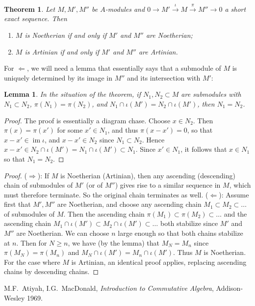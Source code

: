 \documentclass[12pt]{article}
\newtheorem{thm}{Theorem}
\newtheorem{lem}{Lemma}
\DeclareMathOperator{\im}{im}
\begin{document}
\begin{thm} Let $M, M', M''$ be $A$-modules and $0\to M'\overset{\iota}\to M\overset{\pi}\to M''\to 0$ a short exact sequence. Then
\begin{enumerate}
\item $M$ is Noetherian if and only if $M'$ and $M''$ are Noetherian;
\item $M$ is Artinian if and only if $M'$ and $M''$ are Artinian.
\end{enumerate}
\end{thm}

For $\Leftarrow$, we will need a lemma that essentially says that a submodule of $M$ is uniquely determined by its image in $M''$ and its intersection with $M'$:
\begin{lem} In the situation of the theorem, if $N_1, N_2\subset M$ are submodules with $N_1\subset N_2$, $\pi(N_1) = \pi(N_2)$, and $N_1\cap\iota(M') = N_2\cap\iota(M')$, then $N_1 = N_2$.
\end{lem}
\begin{proof} The proof is essentially a diagram chase.
Choose $x\in N_2$. Then $\pi(x) = \pi(x')$ for some $x'\in N_1$, and thus $\pi(x-x')=0$, so that $x-x'\in\im\iota$, and $x-x'\in N_2$ since $N_1\subset N_2$. Hence $x-x'\in N_2\cap \iota(M') = N_1\cap\iota(M')\subset N_1$. Since $x'\in N_1$, it follows that $x\in N_1$ so that $N_1=N_2$.
\end{proof}

\begin{proof}
($\Rightarrow$): If $M$ is Noetherian (Artinian), then any ascending (descending) chain of submodules of $M'$ (or of $M''$) gives rise to a similar sequence in $M$, which must therefore terminate. So the original chain terminates as well.
\newline
($\Leftarrow$): Assume first that $M', M''$ are Noetherian, and choose any ascending chain $M_1\subset M_2\subset\dots$ of submodules of $M$. Then the ascending chain $\pi(M_1)\subset\pi(M_2)\subset\dots$ and the ascending chain $M_1\cap\iota(M')\subset M_2\cap\iota(M')\subset\dots$ both stabilize since $M'$ and $M''$ are Noetherian. We can choose $n$ large enough so that both chains stabilize at $n$. Then for $N\ge n$, we have (by the lemma) that $M_N = M_n$ since $\pi(M_N) = \pi(M_n)$ and $M_N\cap\iota(M') = M_n\cap\iota(M')$. Thus $M$ is Noetherian. For the case where $M$ is Artinian, an identical proof applies, replacing ascending chains by descending chains.
\end{proof}
\begin{thebibliography}{10}
M.F.~Atiyah, I.G.~MacDonald, \emph{Introduction to Commutative Algebra}, Addison-Wesley 1969.
\end{thebibliography}

\end{document}

